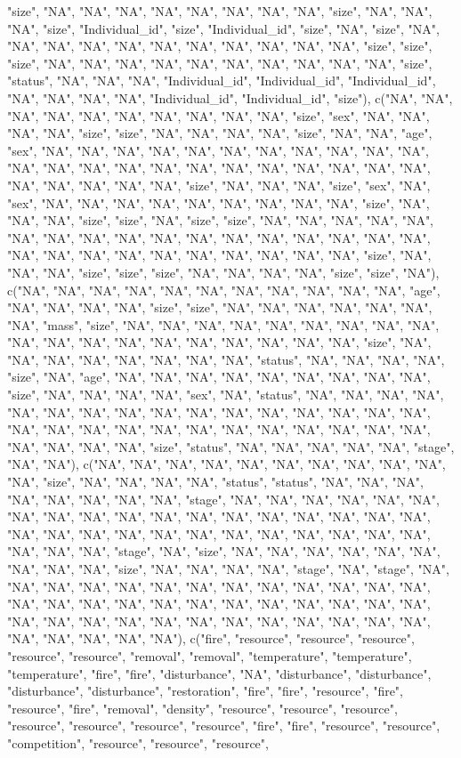 \documentclass{article}\usepackage[]{graphicx}\usepackage[]{color}
\begin{document}
"size", "NA", "NA", "NA", "NA", "NA", "NA", "NA", "NA", "size", "NA", "NA", "NA", "size", "Individual_id", "size", "Individual_id", "size", "NA", "size", "NA", "NA", "NA", "NA", "NA", "NA", "NA", "NA", "NA", "NA", "NA", "size", "size", "size", "NA", "NA", "NA", "NA", "NA", "NA", "NA", "NA", "NA", "NA", "size", "status", "NA", "NA", "NA", "Individual_id", "Individual_id", "Individual_id", "NA", "NA", "NA", "NA", "Individual_id", "Individual_id", "size"), c("NA", "NA", "NA", "NA", "NA", "NA", "NA", "NA", "NA", "NA", "size", "sex", "NA", "NA", "NA", "NA", "size", "size", "NA", "NA", "NA", "NA", "size", "NA", "NA", "age", "sex", "NA", "NA", "NA", "NA", "NA", "NA", "NA", "NA", "NA", "NA", "NA", "NA", "NA", "NA", "NA", "NA", "NA", "NA", "NA", "NA", "NA", "NA", "NA", "NA", "NA", "NA", "NA", "NA", "size", "NA", "NA", "NA", "size", "sex", "NA", "sex", "NA", "NA", "NA", "NA", "NA", "NA", "NA", "NA", "NA", "size", "NA", "NA", "NA", "size", "size", "NA", "size", 
"size", "NA", "NA", "NA", "NA", "NA", "NA", "NA", "NA", "NA", "NA", "NA", "NA", "NA", "NA", "NA", "NA", "NA", "NA", "NA", "NA", "NA", "NA", "NA", "NA", "NA", "NA", "NA", "size", "NA", "NA", "NA", "size", "size", "size", "NA", "NA", "NA", "NA", "size", "size", "NA"), c("NA", "NA", "NA", "NA", "NA", "NA", "NA", "NA", "NA", "NA", "NA", "age", "NA", "NA", "NA", "NA", "size", "size", "NA", "NA", "NA", "NA", "NA", "NA", "NA", "mass", "size", "NA", "NA", "NA", "NA", "NA", "NA", "NA", "NA", "NA", "NA", "NA", "NA", "NA", "NA", "NA", "NA", "NA", "NA", "NA", "size", "NA", "NA", "NA", "NA", "NA", "NA", "NA", "NA", "status", "NA", "NA", "NA", "NA", "size", "NA", "age", "NA", "NA", "NA", "NA", "NA", "NA", "NA", "NA", "NA", "size", "NA", "NA", "NA", "NA", "sex", "NA", "status", 
"NA", "NA", "NA", "NA", "NA", "NA", "NA", "NA", "NA", "NA", "NA", "NA", "NA", "NA", "NA", "NA", "NA", "NA", "NA", "NA", "NA", "NA", "NA", "NA", "NA", "NA", "NA", "NA", "NA", "NA", "NA", "NA", "size", "status", "NA", "NA", "NA", "NA", "NA", "stage", "NA", "NA"), c("NA", "NA", "NA", "NA", "NA", "NA", "NA", "NA", "NA", "NA", "NA", "size", "NA", "NA", "NA", "NA", "status", "status", "NA", "NA", "NA", "NA", "NA", "NA", "NA", "NA", "stage", "NA", "NA", "NA", "NA", "NA", "NA", "NA", "NA", "NA", "NA", "NA", "NA", "NA", "NA", "NA", "NA", "NA", "NA", "NA", "NA", "NA", "NA", "NA", "NA", "NA", "NA", "NA", "NA", "NA", "NA", "NA", "NA", "NA", "stage", "NA", "size", "NA", "NA", "NA", "NA", "NA", "NA", "NA", "NA", "NA", "size", "NA", "NA", "NA", "NA", "stage", "NA", "stage", 
"NA", "NA", "NA", "NA", "NA", "NA", "NA", "NA", "NA", "NA", "NA", "NA", "NA", "NA", "NA", "NA", "NA", "NA", "NA", "NA", "NA", "NA", "NA", "NA", "NA", "NA", "NA", "NA", "NA", "NA", "NA", "NA", "NA", "NA", "NA", "NA", "NA", "NA", "NA", "NA", "NA", "NA"), c("fire", "resource", "resource", "resource", "resource", "resource", "removal", "removal", "temperature", "temperature", "temperature", "fire", "fire", "disturbance", "NA", "disturbance", "disturbance", "disturbance", "disturbance", "restoration", "fire", "fire", "resource", "fire", "resource", "fire", "removal", "density", "resource", "resource", "resource", "resource", "resource", "resource", "resource", "fire", "fire", "resource", "resource", "competition", "resource", "resource", "resource", 
\end{document}
